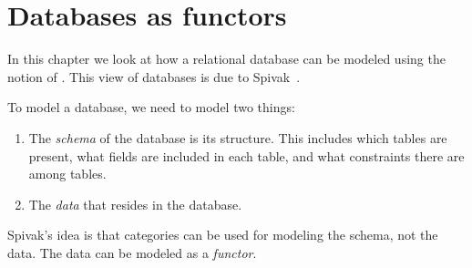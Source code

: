\section{Databases as functors}


In this chapter we look at how a relational database can be modeled using the notion of .
This view of databases is due to Spivak~\cite{spivak2019categorical,spivak2012ologs,}.

To model a database, we need to model two things:
\begin{enumerate}
    \item The \emph{schema} of the database is its structure.
          This includes which tables are present,
          what fields are included in each table, and what constraints there are among tables.
    \item The \emph{data} that resides in the database.
\end{enumerate}

Spivak's idea is that categories can be used for modeling the schema, not the data.
The data can be modeled as a \emph{functor}.

